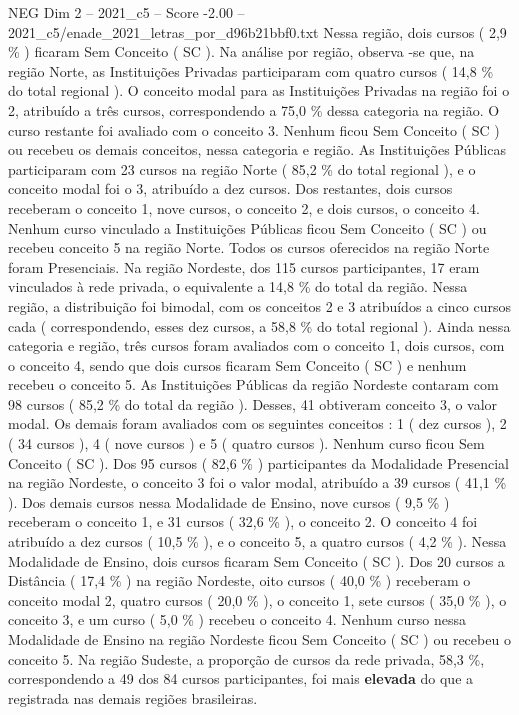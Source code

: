 \begin{textsample}{NEG Dim 2 – 2021\_c5 – Score -2.00 – 2021\_c5/enade\_2021\_letras\_por\_d96b21bbf0.txt}
Nessa região, dois cursos ( 2,9 \% ) ficaram Sem Conceito ( SC ).
Na análise por região, observa -se que, na região Norte, as Instituições Privadas participaram com quatro cursos ( 14,8 \% do total regional ).
O conceito modal para as Instituições Privadas na região foi o 2, atribuído a três cursos, correspondendo a 75,0 \% dessa categoria na região.
O curso restante foi avaliado com o conceito 3.
Nenhum ficou Sem Conceito ( SC ) ou recebeu os demais conceitos, nessa categoria e região.
As Instituições Públicas participaram com 23 cursos na região Norte ( 85,2 \% do total regional ), e o conceito modal foi o 3, atribuído a dez cursos.
Dos restantes, dois cursos receberam o conceito 1, nove cursos, o conceito 2, e dois cursos, o conceito 4.
Nenhum curso vinculado a Instituições Públicas ficou Sem Conceito ( SC ) ou recebeu conceito 5 na região Norte.
Todos os cursos oferecidos na região Norte foram Presenciais.
Na região Nordeste, dos 115 cursos participantes, 17 eram vinculados à rede privada, o equivalente a 14,8 \% do total da região.
Nessa região, a distribuição foi bimodal, com os conceitos 2 e 3 atribuídos a cinco cursos cada ( correspondendo, esses dez cursos, a 58,8 \% do total regional ).
Ainda nessa categoria e região, três cursos foram avaliados com o conceito 1, dois cursos, com o conceito 4, sendo que dois cursos ficaram Sem Conceito ( SC ) e nenhum recebeu o conceito 5.
As Instituições Públicas da região Nordeste contaram com 98 cursos ( 85,2 \% do total da região ).
Desses, 41 obtiveram conceito 3, o valor modal.
Os demais foram avaliados com os seguintes conceitos : 1 ( dez cursos ), 2 ( 34 cursos ), 4 ( nove cursos ) e 5 ( quatro cursos ).
Nenhum curso ficou Sem Conceito ( SC ).
Dos 95 cursos ( 82,6 \% ) participantes da Modalidade Presencial na região Nordeste, o conceito 3 foi o valor modal, atribuído a 39 cursos ( 41,1 \% ).
Dos demais cursos nessa Modalidade de Ensino, nove cursos ( 9,5 \% ) receberam o conceito 1, e 31 cursos ( 32,6 \% ), o conceito 2.
O conceito 4 foi atribuído a dez cursos ( 10,5 \% ), e o conceito 5, a quatro cursos ( 4,2 \% ).
Nessa Modalidade de Ensino, dois cursos ficaram Sem Conceito ( SC ).
Dos 20 cursos a Distância ( 17,4 \% ) na região Nordeste, oito cursos ( 40,0 \% ) receberam o conceito modal 2, quatro cursos ( 20,0 \% ), o conceito 1, sete cursos ( 35,0 \% ), o conceito 3, e um curso ( 5,0 \% ) recebeu o conceito 4.
Nenhum curso nessa Modalidade de Ensino na região Nordeste ficou Sem Conceito ( SC ) ou recebeu o conceito 5.
Na região Sudeste, a proporção de cursos da rede privada, 58,3 \%, correspondendo a 49 dos 84 cursos participantes, foi mais \textbf{elevada} do que a registrada nas demais regiões brasileiras.

\end{textsample}
